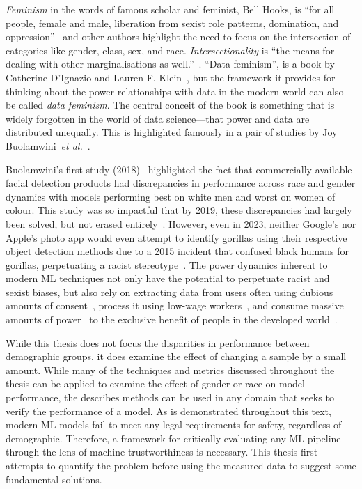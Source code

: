 \textit{Feminism} in the words of famous scholar and feminist, Bell Hooks, is ``for all people, female and male, liberation from sexist role patterns, domination, and oppression''~\cite{hooks} and other authors highlight the need to focus on the intersection of categories like gender, class, sex, and race. 
\textit{Intersectionality} is ``the means for dealing with other marginalisations as well.''~\cite{crenshaw}. 
``Data feminism'', is a book by Catherine D'Ignazio and Lauren F. Klein~\cite{data_feminism}, but the framework it provides for thinking about the power relationships with data in the modern world can also be called \textit{data feminism}. 
The central conceit of the book is something that is widely forgotten in the world of data science---that power and data are distributed unequally. 
This is highlighted famously in a pair of studies by Joy Buolamwini~\textit{et al.}~\cite{buolamwini2018gender,raji2019actionable}.

Buolamwini's first study (2018)~\cite{buolamwini2018gender} highlighted the fact that commercially available facial detection products had discrepancies in performance across race and gender dynamics with models performing best on white men and worst on women of colour. 
This study was so impactful that by 2019, these discrepancies had largely been solved, but not erased entirely~\cite{raji2019actionable}. 
However, even in 2023, neither Google's nor Apple's photo app would even attempt to identify gorillas using their respective object detection methods due to a 2015 incident that confused black humans for gorillas, perpetuating a racist stereotype~\cite{gorillas}. 
The power dynamics inherent to modern ML techniques not only have the potential to perpetuate racist and sexist biases, but also rely on extracting data from users often using dubious amounts of consent~\cite{abelson2021bugs}, process it using low-wage workers~\cite{ai_inclusion}, and consume massive amounts of power~\cite{ai_power} to the exclusive benefit of people in the developed world~\cite{ai_inequity}.

While this thesis does not focus the disparities in performance between demographic groups, it does examine the effect of changing a sample by a small amount. 
While many of the techniques and metrics discussed throughout the thesis can be applied to examine the effect of gender or race on model performance, the describes methods can be used in any domain that seeks to verify the performance of a model. 
As is demonstrated throughout this text, modern ML models fail to meet any legal requirements for safety, regardless of demographic. 
Therefore, a framework for critically evaluating any ML pipeline through the lens of machine trustworthiness is necessary. 
This thesis first attempts to quantify the problem before using the measured data to suggest some fundamental solutions. 

